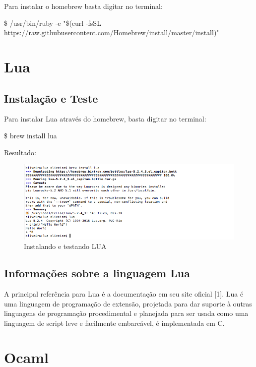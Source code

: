 \documentclass[12pt,a4paper,twoside]{report}
\begin{document}
Para instalar o homebrew basta digitar no terminal:

\begin{terminal}
\$ /usr/bin/ruby -e "\$(curl -fsSL https://raw.githubusercontent.com/Homebrew/install/master/install)"
\end{terminal}


\section{Lua}
\subsection{Instalação e Teste}
Para instalar Lua através do homebrew, basta digitar no terminal:
\begin{terminal}
\$ brew install lua
\end{terminal}
Resultado:
\begin{figure}[!ht]
\centering
\caption{Instalando e testando LUA}
\includegraphics[scale=0.27]{imagens/brew-lua.png}
\end{figure}
\subsection{Informações sobre a linguagem Lua}
A principal referência para Lua é a documentação em seu site oficial [1].
Lua é uma linguagem de programação de extensão, projetada para dar suporte à outras linguagens de programação procedimental e planejada para ser usada como uma linguagem de script leve e facilmente embarcável, é implementada em C.



\section{Ocaml}
\end{document}

